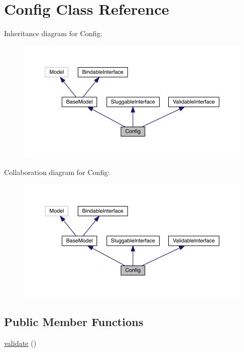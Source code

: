 \hypertarget{class_entity_1_1_config}{\section{Config Class Reference}
\label{class_entity_1_1_config}
}


Inheritance diagram for Config\-:
\nopagebreak
\begin{figure}[H]
\begin{center}
\leavevmode
\includegraphics[width=350pt]{class_entity_1_1_config__inherit__graph}
\end{center}
\end{figure}


Collaboration diagram for Config\-:
\nopagebreak
\begin{figure}[H]
\begin{center}
\leavevmode
\includegraphics[width=350pt]{class_entity_1_1_config__coll__graph}
\end{center}
\end{figure}
\subsection*{Public Member Functions}
\begin{DoxyCompactItemize}
\item 
\hyperlink{class_entity_1_1_config_a184909dab34698899937d810a9f5d393}{validate} ()
\end{DoxyCompactItemize}
